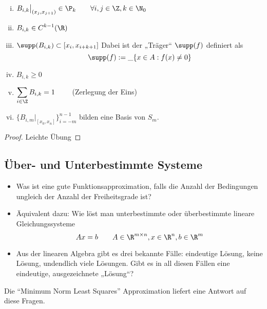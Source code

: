 \documentclass[a4paper,11pt]{scrartcl}
\begin{document}
\begin{st}[Eigenschaften]
	\label{1.36}
	\begin{enumerate}[i)]
		\item
			$\displaystyle B_{i,k}\big|_{(x_j,x_{j+1})} \in \P_k \qquad \forall i,j\in \Z, k\in \N_0$
		\item
			$\displaystyle B_{i,k} \in C^{k-1}(\R)$
		\item
			$\displaystyle \supp (B_{i,k}) \subset [x_i,x_{i+k+1}]$
			Dabei ist der „Träger“ $\supp (f)$ definiert als
			\[
				\supp(f) := \_{\{x\in A : f(x) \neq 0\}}
			\]
		\item
			$\displaystyle B_{i,k} \ge 0$
		\item
			$\displaystyle \sum_{i\in \Z} B_{i,k} = 1 \qquad$ (Zerlegung der Eins)
		\item
			$\displaystyle \{B_{i,m}\big|_{[x_0,x_n]}\}_{i=-m}^{n-1}$ bilden eine Basis von $S_m$.
	\end{enumerate}
	\begin{proof}
		Leichte Übung
	\end{proof}
\end{st}


\subsection{Über- und Unterbestimmte Systeme}


\begin{itemize}
	\item
		Was ist eine gute Funktionsapproximation, falls die Anzahl der Bedingungen ungleich der Anzahl der Freiheitsgrade ist?
	\item
		Äquivalent dazu: Wie löst man unterbestimmte oder überbestimmte lineare Gleichungssysteme
		\[
			Ax=b \qquad A\in \R^{m\times n}, x\in \R^n, b\in \R^m
		\]
	\item
		Aus der linearen Algebra gibt es drei bekannte Fälle: eindeutige Lösung, keine Lösung, undendlich viele Lösungen.
		Gibt es in all diesen Fällen eine eindeutige, ausgezeichnete „Lösung“?
\end{itemize}

Die “Minimum Norm Least Squares” Approximation liefert eine Antwort auf diese Fragen.
\end{document}
